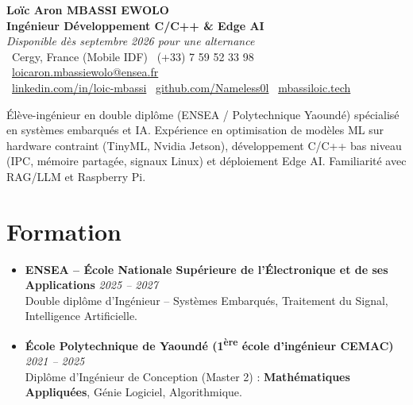\documentclass[a4paper,11pt]{article}
\begin{document}
\begin{center}
    {\Large \textbf{Loïc Aron MBASSI EWOLO}} \\ \vspace{4pt}
    \textbf{\large Ingénieur Développement C/C++ \& Edge AI} \\
    \textit{\small Disponible dès septembre 2026 pour une alternance} \\ \vspace{4pt}
    \small
    \faMapMarker\ Cergy, France (Mobile IDF) \quad
    \faPhone\ (+33) 7 59 52 33 98 \quad
    \faEnvelope\ \href{mailto:loicaron.mbassiewolo@ensea.fr}{loicaron.mbassiewolo@ensea.fr} \\ \vspace{2pt}
    \faLinkedin\ \href{https://www.linkedin.com/in/loic-mbassi/}{linkedin.com/in/loic-mbassi} \quad
    \faGithub\ \href{https://github.com/Nameless0l}{github.com/Nameless0l} \quad
    \faGlobe\ \href{https://mbassiloic.tech}{mbassiloic.tech}
\end{center}

\vspace{-6pt}

\noindent\small{Élève-ingénieur en double diplôme (ENSEA / Polytechnique Yaoundé) spécialisé en systèmes embarqués et IA. Expérience en optimisation de modèles ML sur hardware contraint (TinyML, Nvidia Jetson), développement C/C++ bas niveau (IPC, mémoire partagée, signaux Linux) et déploiement Edge AI. Familiarité avec RAG/LLM et Raspberry Pi.}

\section{Formation}
\begin{itemize}[leftmargin=*, label=\tiny$\bullet$, nosep]
    \item \textbf{ENSEA -- École Nationale Supérieure de l'Électronique et de ses Applications} \hfill \textit{2025 -- 2027} \\
    \small{Double diplôme d'Ingénieur -- Systèmes Embarqués, Traitement du Signal, Intelligence Artificielle.}
    \item \textbf{École Polytechnique de Yaoundé (1\textsuperscript{ère} école d'ingénieur CEMAC)} \hfill \textit{2021 -- 2025} \\
    \small{Diplôme d'Ingénieur de Conception (Master 2) : \textbf{Mathématiques Appliquées}, Génie Logiciel, Algorithmique.}
\end{itemize}
\end{document}
